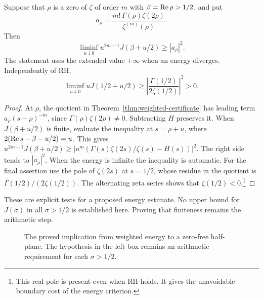 \begin{proposition}
\label{prop:weighted-pole-cost}
Suppose that \(\rho\) is a zero of \(\zeta\) of order \(m\) with
\(\beta=\operatorname{Re}\rho>1/2\), and put
\[
 a_\rho=\frac{m!\,\Gamma(\rho)\zeta(2\rho)}{\zeta^{(m)}(\rho)}.
\]
Then
\[
 \liminf_{u\downarrow0}u^{2m-1}J(\beta+u/2)\ge |a_\rho|^2.
\]
The statement uses the extended value \(+\infty\) when an
energy diverges. Independently of RH,
\[
 \liminf_{u\downarrow0}u J(1/2+u/2)
 \ge\left|\frac{\Gamma(1/2)}{2\zeta(1/2)}\right|^2>0.
\]
\end{proposition}
\begin{proof}
At \(\rho\), the quotient in Theorem~\ref{thm:weighted-certificate}
has leading term \(a_\rho(s-\rho)^{-m}\), since
\(\Gamma(\rho)\zeta(2\rho)\ne0\). Subtracting \(H\)
preserves it. When \(J(\beta+u/2)\) is finite, evaluate the
inequality at \(s=\rho+u\), where
\(2(\operatorname{Re} s-\beta-u/2)=u\). This gives
\(u^{2m-1}J(\beta+u/2)\ge
|u^m(\Gamma(s)\zeta(2s)/\zeta(s)-H(s))|^2\).
The right side tends to \(|a_\rho|^2\).
When the energy is infinite the inequality is automatic.
For the final assertion use the pole of \(\zeta(2s)\) at
\(s=1/2\), whose residue in the quotient is
\(\Gamma(1/2)/(2\zeta(1/2))\). The alternating zeta series
shows that \(\zeta(1/2)<0\).\footnote{This real pole is
present even when RH holds. It gives the unavoidable
boundary cost of the energy criterion.}
\end{proof}

These are explicit tests for a proposed energy estimate.
No upper bound for \(J(\sigma)\) in all \(\sigma>1/2\)
is established here. Proving that finiteness remains the
arithmetic step.

\begin{figure}[ht]
\centering
{}
\caption{The proved implication from weighted energy to a zero-free
half-plane. The hypothesis in the left box remains an arithmetic
requirement for each $\sigma>1/2$.}
\label{fig:weighted-energy-certificate}
\end{figure}
